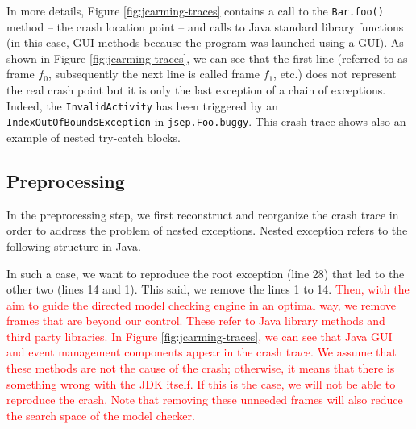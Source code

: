 \documentclass[times, doublespace]{smrauth}
\newcommand{\red}[1]{\textcolor{red}{#1}}
\begin{document}
In more details, Figure \ref{fig:jcarming-traces} contains a call to the {\tt Bar.foo()}
method -- the crash location point -- and calls to Java standard
library functions (in this case, GUI methods because the
program was launched using a GUI).
As shown in Figure \ref{fig:jcarming-traces}, we can see that the first line (referred to
as frame {\it $f_0$}, subsequently the next line is called frame {\it $f_1$}, etc.)
does not represent the real crash point but it is only the last
exception of a chain of exceptions. Indeed, the {\tt InvalidActivity}
has been triggered by an {\tt IndexOutOfBoundsException} in
{\tt jsep.Foo.buggy}. This crash trace shows also an example of nested try-catch blocks.



\subsection{Preprocessing}

In the preprocessing step, we first reconstruct and reorganize
the crash trace in order to address the problem of nested
exceptions. Nested exception refers to the following structure in Java. \\

\noindent{}

\vspace*{0.3cm}

In such a case, we want to reproduce the root exception (line 28)
that led to the other two (lines 14 and 1). This said, we remove the lines
1 to 14. \red{Then, with the aim to guide the directed model checking engine in an optimal way, we remove frames
that are beyond our control. These refer
to Java library methods and third
party libraries. In Figure \ref{fig:jcarming-traces}, we can see that Java GUI and
event management components appear in the crash trace. We
assume that these methods are not the cause of the crash;
otherwise, it means that there is something wrong with the JDK itself. If this is the case,  we will not be able to reproduce
the crash. Note that removing these unneeded frames will also
reduce the search space of the model checker.}
\end{document}
